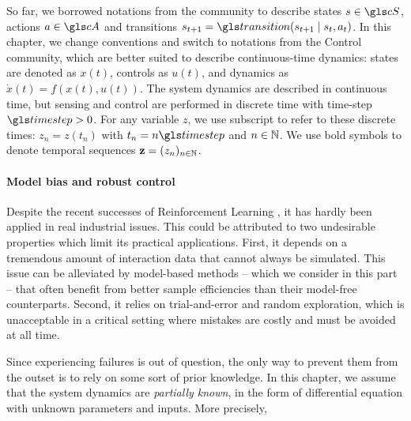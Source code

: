 \begin{remark}
\begin{leftbar}[remarkbar]
So far, we borrowed notations from the  community to describe states $s\in \cS$, actions $a\in\cA$ and transitions $s_{t+1} = \Ps\parentheses{s_{t+1}\mid s_t,a_t}$. In this chapter, we change conventions and switch to notations from the Control community, which are better suited to describe continuous-time dynamics: states are denoted as $x(t)$, controls as $u(t)$, and dynamics as $\dot{x}(t) = f(x(t), u(t))$. 
The system dynamics are described in continuous time, but sensing and control are performed in discrete time with time-step $\timestep>0$. For any variable $z$, we use subscript to refer to these discrete times: $z_n = z(t_n)$ with $t_n = n\timestep$ and $n\in\mathbb{N}$. We use bold symbols to denote temporal sequences $\mathbf{z} = (z_n)_{n\in\mathbb{N}}$.
\end{leftbar}
\end{remark}

\paragraph{Model bias and robust control}
Despite the recent successes of Reinforcement Learning \citep[\eg][]{Mnih2015humanlevel,Silver2018}, it has hardly been applied in real industrial issues. This could be attributed to two undesirable properties which limit its practical applications. First, it depends on a tremendous amount of interaction data that cannot always be simulated. This issue can be alleviated by model-based methods -- which we consider in this part -- that often benefit from better sample efficiencies than their model-free counterparts. Second, it relies on trial-and-error and random exploration, which is unacceptable in a critical setting where mistakes are costly and must be avoided at all time.

Since experiencing failures is out of question, the only way to prevent them from the outset is to rely on some sort of prior knowledge. In this chapter, we assume that the system dynamics are \emph{partially known}, in the form of differential equation with unknown parameters and inputs. More precisely,

